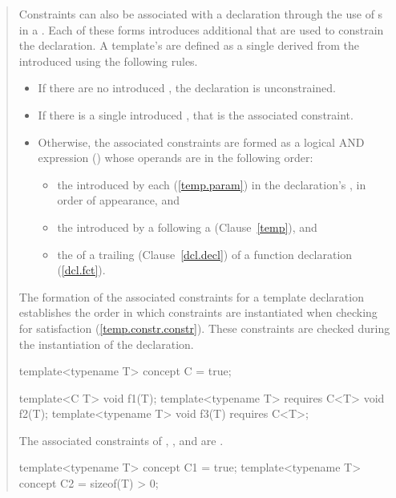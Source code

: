 \begin{quote}
\begin{addedblock}
\pnum
Constraints can also be associated with a declaration through the use of 
s in a 
.
% 
Each of these forms introduces additional  
that are used to constrain the declaration.
% 
A template's  are defined as a 
single  derived from the
introduced  using the
following rules.

\begin{itemize}
\item If there are no introduced ,
the declaration is unconstrained.

\item If there is a single introduced ,
that is the associated constraint.

\item Otherwise, the associated constraints are formed as a logical 
AND expression () whose operands are in the following order:
% 
\begin{itemize}
\item the  introduced by each
       (\ref{temp.param}) in the 
      declaration's , in
      order of appearance, and

\item the  introduced
      by a  following a 
       (Clause~\ref{temp}), and

\item the  of a trailing 
       (Clause~\ref{dcl.decl}) 
      of a function declaration (\ref{dcl.fct}).
\end{itemize}
\end{itemize}
% 
The formation of the associated constraints for a template declaration
establishes the order in which constraints are instantiated when checking 
for satisfaction (\ref{temp.constr.constr}).
% 
\enternote
These constraints are checked during the instantiation of the declaration.
\exitnote
% 
\enterexample
\begin{codeblock}
template<typename T> concept C = true;

template<C T> void f1(T);
template<typename T> requires C<T> void f2(T);
template<typename T> void f3(T) requires C<T>;
\end{codeblock}
The associated constraints of , , and 
are .
% 
\begin{codeblock}
template<typename T> concept C1 = true;
template<typename T> concept C2 = sizeof(T) > 0;


\end{codeblock}
\end{addedblock}
\end{quote}
